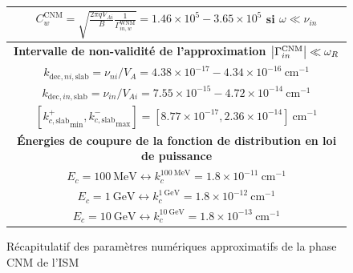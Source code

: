 \documentclass[10pt,a4paper]{article}
\begin{document}
\begin{figure}[h]
\begin{tabular}{|c|}
$C^\mathrm{CNM}_w = \sqrt{\frac{2\pi qV_{Ai}}{B} \frac{1}{\Gamma^\mathrm{WNM}_{in,w}}} = 1.46\times 10^5 - 3.65 \times 10^5$ si $\omega \ll \nu_{in}$ \\ 
\hline 
\hline
\bf{Intervalle de non-validité de l'approximation $\abs{\Gamma^\mathrm{CNM}_{in}} \ll \omega_R$} \\ 
\hline
$k_{\mathrm{dec},ni,\mathrm{slab}} = \nu_{ni}/V_A = 4.38\times 10^{-17} - 4.34 \times 10^{-16} ~ \mathrm{cm}^{-1}$ \\ 
$k_{\mathrm{dec},in,\mathrm{slab}} = \nu_{in}/V_{Ai} = 7.55\times 10^{-15} - 4.72 \times 10^{-14} ~ \mathrm{cm}^{-1}$ \\ 
$\left[{k^+_{c,\mathrm{slab}}}_\mathrm{min}, {k^-_{c,\mathrm{slab}}}_\mathrm{max} \right] = [8.77 \times 10^{-17}, 2.36\times 10^{-14}] ~ \mathrm{cm}^{-1}$ \\ 
\hline
\hline
\bf{Énergies de coupure de la fonction de distribution en loi de puissance} \\ 
\hline
$E_c = 100~\mathrm{MeV} \leftrightarrow k^{100~\mathrm{MeV}}_c = 1.8\times 10^{-11}~\mathrm{cm}^{-1}$ \\ 
$E_c = 1~\mathrm{GeV} \leftrightarrow k^{1~\mathrm{GeV}}_c = 1.8\times 10^{-12}~\mathrm{cm}^{-1}$     \\ 
$E_c = 10~\mathrm{GeV} \leftrightarrow k^{10~\mathrm{GeV}}_c = 1.8\times 10^{-13}~\mathrm{cm}^{-1}$   \\ 
\hline

\end{tabular}
\caption{Récapitulatif des paramètres numériques approximatifs de la phase CNM de l'ISM} 
\end{figure}
\end{document}
